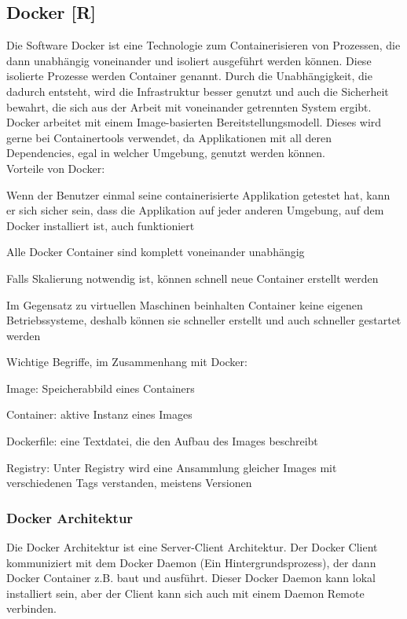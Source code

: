 \subsection{Docker [R]} \label{tech:docker}
Die Software Docker ist eine Technologie zum Containerisieren von Prozessen, die dann unabhängig voneinander und isoliert ausgeführt werden können. Diese isolierte Prozesse werden Container genannt.
Durch die Unabhängigkeit, die dadurch entsteht, wird die Infrastruktur besser genutzt und auch die Sicherheit bewahrt, die sich aus der Arbeit mit voneinander getrennten System ergibt.
Docker arbeitet mit einem Image-basierten Bereitstellungsmodell. Dieses wird gerne bei Containertools verwendet, da Applikationen mit all deren Dependencies, egal in welcher Umgebung, genutzt werden können. \cite{docker} \\
Vorteile von Docker: \cite{docker_vorteile}
\begin{compactitem}
    \item Wenn der Benutzer einmal seine containerisierte Applikation getestet hat, kann er sich sicher sein, dass die Applikation auf jeder anderen Umgebung, auf dem Docker installiert ist, auch funktioniert
    \item Alle Docker Container sind komplett voneinander unabhängig
    \item Falls Skalierung notwendig ist, können schnell neue Container erstellt werden
    \item Im Gegensatz zu virtuellen Maschinen beinhalten Container keine eigenen Betriebssysteme, deshalb können sie schneller erstellt und auch schneller gestartet werden
\end{compactitem}

Wichtige Begriffe, im Zusammenhang mit Docker:

\begin{compactitem}
    \item Image: Speicherabbild eines Containers
    \item Container: aktive Instanz eines Images
    \item Dockerfile: eine Textdatei, die den Aufbau des Images beschreibt
    \item Registry: Unter Registry wird eine Ansammlung gleicher Images mit verschiedenen Tags verstanden, meistens Versionen
\end{compactitem}

\subsubsection{Docker Architektur}
Die Docker Architektur ist eine Server-Client Architektur. Der Docker Client kommuniziert mit dem Docker Daemon (Ein Hintergrundsprozess), der dann Docker Container z.B. baut und ausführt.
Dieser Docker Daemon kann lokal installiert sein, aber der Client kann sich auch mit einem Daemon Remote verbinden. \cite{docker_architektur}

